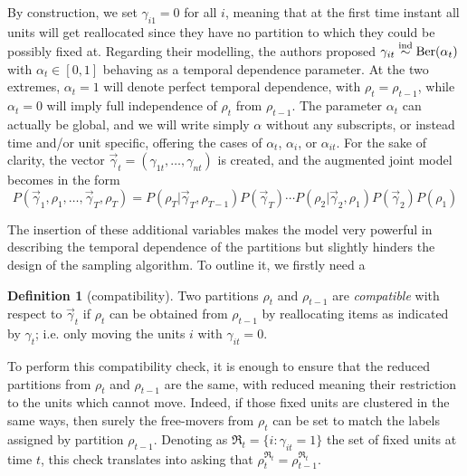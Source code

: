 \documentclass[12pt,	%
	a4paper,		%
	twoside,		%
	openright,		%
	titlepage,%
	]{book}
\theoremstyle{definition}
\newtheorem{definition}{Definition}[chapter]
\begin{document}
By construction, we set $\gamma_{i1}=0$ for all $i$, meaning that at the first time instant all units will get reallocated since they have no partition to which they could be possibly fixed at. Regarding their modelling, the authors proposed $\gamma_{it} \overset{\text{ind}}{\sim} \text{Ber}(\alpha_t)$ with $\alpha_t \in [0,1]$ behaving as a temporal dependence parameter. At the two extremes, $\alpha_t=1$ will denote perfect temporal dependence, with $\rho_t = \rho_{t-1}$, while $\alpha_t=0$ will imply full independence of $\rho_t$ from $\rho_{t-1}$. The parameter $\alpha_t$ can actually be global, and we will write simply $\alpha$ without any subscripts, or instead time and/or unit specific, offering the cases of $\alpha_t$, $\alpha_i$, or $\alpha_{it}$. For the sake of clarity, the vector $\vec{\gamma}_t = (\gamma_{1t},\ldots,\gamma_{nt})$ is created, and the augmented joint model becomes in the form
\begin{equation}
P(\vec{\gamma}_1,\rho_1, \ldots, \vec{\gamma}_T,\rho_T) = P(\rho_T|\vec{\gamma}_T,\rho_{T-1})P(\vec{\gamma}_T) \cdots P(\rho_2|\vec{\gamma}_2,\rho_1)P(\vec{\gamma}_2) P(\rho_1) \label{trpm}
\end{equation}


The insertion of these additional variables makes the model very powerful in describing the temporal dependence of the partitions but slightly hinders the design of the sampling algorithm. To outline it, we firstly need a 
\begin{definition}[compatibility]
Two partitions $\rho_t$ and $\rho_{t-1}$ are \textit{compatible} with respect to $\vec{\gamma}_t$ if $\rho_t$ can be obtained from $\rho_{t-1}$ by reallocating items as indicated by $\gamma_t$; i.e. only moving the units $i$ with $\gamma_{it}=0$. 
\end{definition}
To perform this compatibility check, it is enough to ensure that the reduced partitions from $\rho_t$ and $\rho_{t-1}$ are the same, with reduced meaning their restriction to the units which cannot move. Indeed, if those fixed units are clustered in the same ways, then surely the free-movers from $\rho_{t}$ can be set to match the labels assigned by partition $\rho_{t-1}$. Denoting as $\mathfrak{R}_t= \{ i : \gamma_{it}=1\}$ the set of fixed units at time $t$, this check translates into asking that $\rho_t^{\mathfrak{R}_t} = \rho_{t-1}^{\mathfrak{R}_t}$.
\end{document}
